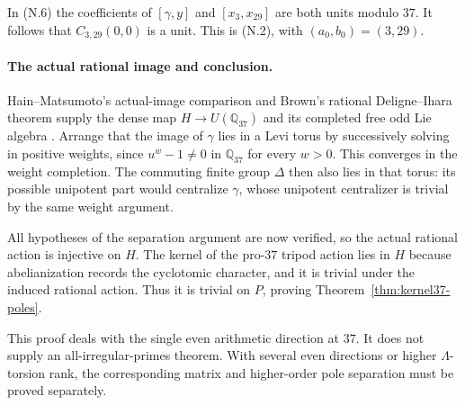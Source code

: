 In (N.6) the coefficients of $[\gamma,y]$ and $[x_3,x_{29}]$ are both units modulo $37$. It follows that $C_{3,29}(0,0)$ is a unit. This is (N.2), with $(a_0,b_0)=(3,29)$.

\paragraph{The actual rational image and conclusion.}
Hain--Matsumoto's actual-image comparison and Brown's rational Deligne--Ihara theorem supply the dense map $H\to U(\mathbb Q_{37})$ and its completed free odd Lie algebra \cite[Proposition~8.3, Theorem~8.4]{HainMatsumoto2001}\cite[\S2.1--2.3]{Brown2019}. Arrange that the image of $\gamma$ lies in a Levi torus by successively solving in positive weights, since $u^w-1\ne0$ in $\mathbb Q_{37}$ for every $w>0$. This converges in the weight completion. The commuting finite group $\Delta$ then also lies in that torus: its possible unipotent part would centralize $\gamma$, whose unipotent centralizer is trivial by the same weight argument.

All hypotheses of the separation argument are now verified, so the actual rational action is injective on $H$. The kernel of the pro-$37$ tripod action lies in $H$ because abelianization records the cyclotomic character, and it is trivial under the induced rational action. Thus it is trivial on $P$, proving Theorem~\ref{thm:kernel37-poles}.

This proof deals with the single even arithmetic direction at $37$. It does not supply an all-irregular-primes theorem. With several even directions or higher $\Lambda$-torsion rank, the corresponding matrix and higher-order pole separation must be proved separately.
